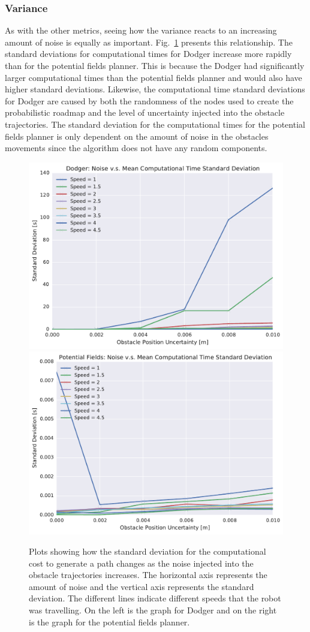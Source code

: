 \documentclass[letterpaper, 10pt, conference]{ieeeconf}
\begin{document}
\subsubsection{Variance}

As with the other metrics, seeing how the variance reacts to an increasing
amount of noise is equally as important. Fig.~\ref{fig:plot_std_comp_time}
presents this relationship. The standard deviations for computational times for
Dodger increase more rapidly than for the potential fields planner. This is
because the Dodger had significantly larger computational times than the
potential fields planner and would also have higher standard deviations.
Likewise, the computational time standard deviations for Dodger are caused by
both the randomness of the nodes used to create the probabilistic roadmap and
the level of uncertainty injected into the obstacle trajectories. The standard
deviation for the computational times for the potential fields planner is only
dependent on the amount of noise in the obstacles movements since the algorithm
does not have any random components.

\begin{figure}[h!]
    \centering
    \includegraphics[width=0.48\linewidth]{figs/planner_std_avg_times_0}
    \includegraphics[width=0.48\linewidth]{figs/pf_std_avg_times_0}

    \caption{Plots showing how the standard deviation for the computational
        cost to generate a path changes as the noise injected into the obstacle
        trajectories increases.  The horizontal axis represents the amount of
        noise and the vertical axis represents the standard deviation. The
    different lines indicate different speeds that the robot was travelling. On
the left is the graph for Dodger and on the right is the graph for the
potential fields planner.}

    \label{fig:plot_std_comp_time}
\end{figure}
\end{document}
